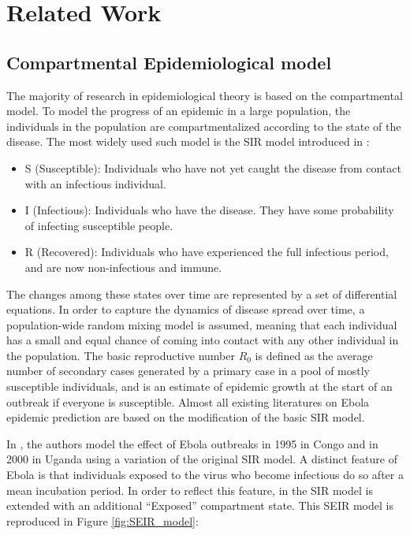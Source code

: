 \documentclass[10pt, journal,onecolumn]{IEEEtran}
\begin{document}

\section{{Related Work}}
\label{sec:RelatedWork}

\subsection{Compartmental Epidemiological model}
\label{SubSec:SIR}

The majority of research in epidemiological theory is based on the compartmental model. To model the progress of an epidemic in a large population, the individuals in the population are compartmentalized according to the state of the disease. The most widely used such model is the SIR model introduced in \citep{very_old_paper}:

\begin{itemize}
\item {S (Susceptible):} Individuals who have not yet caught the disease from contact with an infectious
  individual.
\item {I (Infectious):} Individuals who have the disease. They have some probability of
  infecting susceptible people.
\item {R (Recovered):} Individuals who have experienced the full infectious period, and are
  now non-infectious and immune.
\end{itemize}

The changes among these states over time are represented by a set of differential equations. In
order to capture the dynamics of disease spread over time, a population-wide random mixing model is
assumed, meaning that each individual has a small and equal chance of coming into contact with
any other individual in the population. The basic reproductive number $R_0$
is defined as the average number of secondary cases generated by a primary case in a pool of mostly
susceptible individuals, and is an estimate of epidemic growth at the start of an outbreak if
everyone is susceptible. Almost all existing literatures \citep{chowell2004basic,legrand2007understanding,gomes2014assessing} on Ebola epidemic prediction are based on the modification of the basic SIR model.

In \citep{chowell2004basic}, the authors model the effect of Ebola outbreaks in 1995 in Congo and in
2000 in Uganda using a variation of the original SIR model. A distinct feature of Ebola is that individuals exposed to the virus who become infectious do so after a mean incubation period. In order to reflect this feature, in the SIR model is extended with an additional ``Exposed'' compartment state. This SEIR model is reproduced in
Figure \ref{fig:SEIR_model}:
\end{document}
